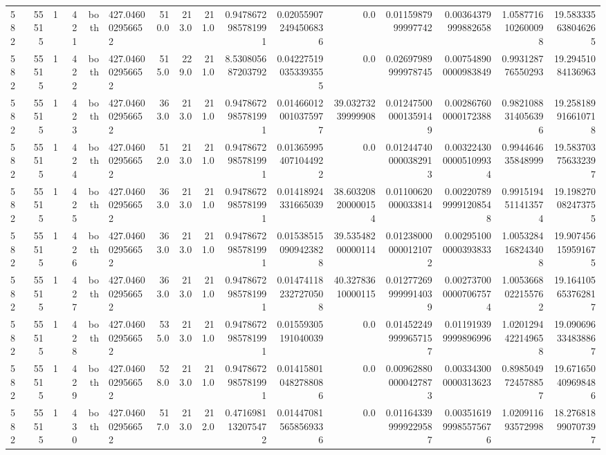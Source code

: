 \begin{tabular}{lrrrrlrrrrrrrrrr}
582 & 55515 & 1 & 421 & both & 427.046002956652 & 510.0 & 213.0 & 211.0 & 0.9478672985781991 & 0.020559072494506836 & 0.0 & 0.0115987999997742 & 0.00364379999882658 & 1.0587716102600098 & 19.583335638046265 \\
582 & 55515 & 1 & 422 & both & 427.046002956652 & 515.0 & 229.0 & 211.0 & 8.530805687203792 & 0.042275190353393555 & 0.0 & 0.02697989999978745 & 0.007548900000983849 & 0.993128776550293 & 19.29451084136963 \\
582 & 55515 & 1 & 423 & both & 427.046002956652 & 363.0 & 213.0 & 211.0 & 0.9478672985781991 & 0.014660120010375977 & 39.03273239999908 & 0.012475000001359149 & 0.002867600000172388 & 0.9821088314056396 & 19.258189916610718 \\
582 & 55515 & 1 & 424 & both & 427.046002956652 & 512.0 & 213.0 & 211.0 & 0.9478672985781991 & 0.013659954071044922 & 0.0 & 0.012447400000382913 & 0.0032243000005109934 & 0.994464635848999 & 19.583703756332397 \\
582 & 55515 & 1 & 425 & both & 427.046002956652 & 363.0 & 213.0 & 211.0 & 0.9478672985781991 & 0.01418924331665039 & 38.603208200000154 & 0.01100620000033814 & 0.0022078999991208548 & 0.9915194511413574 & 19.198270082473755 \\
582 & 55515 & 1 & 426 & both & 427.046002956652 & 363.0 & 213.0 & 211.0 & 0.9478672985781991 & 0.015385150909423828 & 39.53548200000114 & 0.012380000000121072 & 0.002951000000393833 & 1.0053284168243408 & 19.907456159591675 \\
582 & 55515 & 1 & 427 & both & 427.046002956652 & 363.0 & 213.0 & 211.0 & 0.9478672985781991 & 0.014741182327270508 & 40.32783610000115 & 0.012772699999914039 & 0.0027370000007067574 & 1.0053668022155762 & 19.164105653762817 \\
582 & 55515 & 1 & 428 & both & 427.046002956652 & 535.0 & 213.0 & 211.0 & 0.9478672985781991 & 0.01559305191040039 & 0.0 & 0.014522499999657157 & 0.011919399999896996 & 1.0201294422149658 & 19.090696334838867 \\
582 & 55515 & 1 & 429 & both & 427.046002956652 & 528.0 & 213.0 & 211.0 & 0.9478672985781991 & 0.014158010482788086 & 0.0 & 0.009628800000427873 & 0.003343000000313623 & 0.8985049724578857 & 19.671650409698486 \\
582 & 55515 & 1 & 430 & both & 427.046002956652 & 517.0 & 213.0 & 212.0 & 0.4716981132075472 & 0.014470815658569336 & 0.0 & 0.011643399999229587 & 0.0035161999985575676 & 1.020911693572998 & 18.276818990707397 \\
\hline
\end{tabular}
